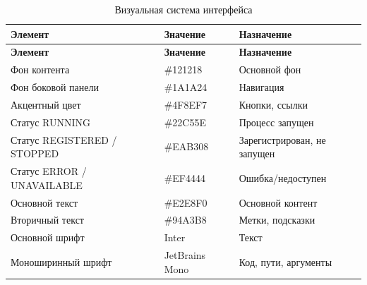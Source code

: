
\begin{xltabular}{\textwidth}{|X|X|X|}
\caption{Визуальная система интерфейса} \label{tab:ui-colors} \\
\hline
\textbf{Элемент} & \textbf{Значение} & \textbf{Назначение} \\ \hline
\endfirsthead
\hline
\textbf{Элемент} & \textbf{Значение} & \textbf{Назначение} \\ \hline
\endhead

Фон контента & \#121218 & Основной фон \\ \hline
Фон боковой панели & \#1A1A24 & Навигация \\ \hline
Акцентный цвет & \#4F8EF7 & Кнопки, ссылки \\ \hline
Статус RUNNING & \#22C55E & Процесс запущен \\ \hline
Статус REGISTERED / STOPPED & \#EAB308 & Зарегистрирован, не запущен \\ \hline
Статус ERROR / UNAVAILABLE & \#EF4444 & Ошибка/недоступен \\ \hline
Основной текст & \#E2E8F0 & Основной контент \\ \hline
Вторичный текст & \#94A3B8 & Метки, подсказки \\ \hline
Основной шрифт & Inter & Текст \\ \hline
Моноширинный шрифт & JetBrains Mono & Код, пути, аргументы \\ \hline
\end{xltabular}

